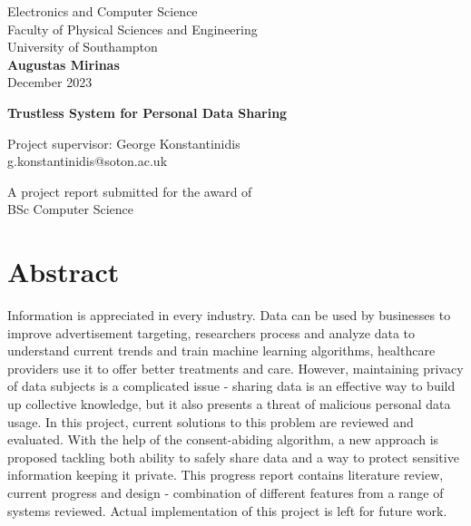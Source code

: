 \documentclass[12pt]{article}
\begin{document}
    \begin{titlepage}
        \begin{center}
            \vspace{1cm}

            \LARGE
            Electronics and Computer Science\\
            Faculty of Physical Sciences and Engineering\\
            University of Southampton\\

            \Large
            \vspace{1.5cm}
            \textbf{Augustas Mirinas}\\
            December 2023

            \LARGE
            \vspace{1.5cm}
            \textbf{Trustless System for Personal Data Sharing}
            
            \vspace{1.5cm}
            \Large
            Project supervisor: George Konstantinidis\\
            g.konstantinidis@soton.ac.uk
            
            \vfill
            A project report submitted for the award of\\
            BSc Computer Science
            
        \end{center}
    \end{titlepage}

    \section*{Abstract}
    Information is appreciated in every industry. Data can be used by businesses to improve advertisement targeting, researchers process and analyze data to understand current trends and train machine learning algorithms, healthcare providers use it to offer better treatments and care. However, maintaining privacy of data subjects is a complicated issue - sharing data is an effective way to build up collective knowledge, but it also presents a threat of malicious personal data usage. In this project, current solutions to this problem are reviewed and evaluated. With the help of the consent-abiding algorithm, a new approach is proposed tackling both ability to safely share data and a way to protect sensitive information keeping it private. This progress report contains literature review, current progress and design - combination of different features from a range of systems reviewed. Actual implementation of this project is left for future work.
\end{document}

